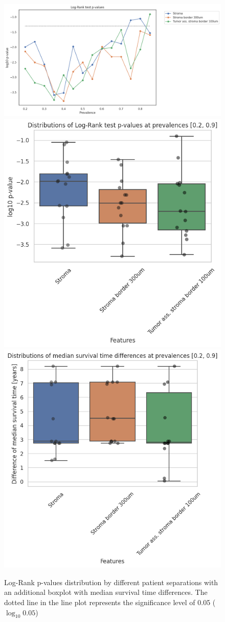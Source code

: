 \begin{figure}[h!]
\includegraphics[width=\linewidth]{figures/survival/pvalue_prevalence_selected.png}
\includegraphics[width=0.5\linewidth]{figures/survival/pvalue_boxplot_selected.png}
\includegraphics[width=0.5\linewidth]{figures/survival/surv_time_boxplot_selected.png}
\caption{Log-Rank p-values distribution by different patient separations with an additional boxplot
with median survival time differences. The dotted line in the line plot represents the significance level of 0.05 ($\log_{10} 0.05$)}
\label{fig:pvalues_tils_selected}
\end{figure}


